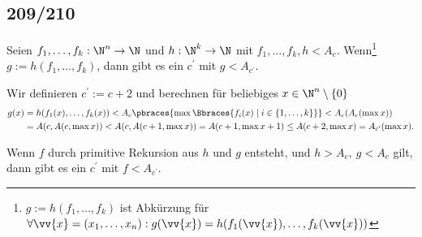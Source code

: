 \subsection*{209/210}

\begin{exercise}[209]

Seien $f_1,\dots,f_k: \N^n \to \N$ und $h: \N^k \to \N$ mit $f_1,\dots,f_k, h < A_c$.
Wenn\footnote{$g := h(f_1,\dots,f_k)$ ist Abkürzung für $\forall \vv{x} = (x_1,\dots,x_n):
g(\vv{x}) = h(f_1(\vv{x}),\dots,f_k(\vv{x}))$} $g := h(f_1,\dots,f_k)$, dann gibt
es ein $c^{\prime}$ mit $g < A_{c^{\prime}}$.

\end{exercise}


\begin{solution}

	Wir definieren $c^\prime := c + 2$ und berechnen für beliebiges $x \in \N^n \setminus \{0\}$
	\begin{align*}
	g(x) &= h(f_1(x), \dots, f_k(x)) < A_c\pbraces{\max\Bbraces{f_i(x) \mid i \in \{1, \dots, k\} }} < A_c(A_c(\max x)) \\
	&= A(c, A(c, \max x)) < A(c, A(c + 1, \max x)) = A(c + 1, \max x + 1) \leq A(c + 2, \max x) = A_{c^\prime}(\max x).
	\end{align*}
\end{solution}

\begin{exercise}[210]

Wenn $f$ durch primitive Rekursion aus $h$ und $g$ entsteht, und $h > A_c,\ g < A_c$
gilt, dann gibt es ein $c^{\prime}$ mit $f < A_{c^{\prime}}$.

\end{exercise}


\begin{solution}

\phantom{}

\end{solution}
